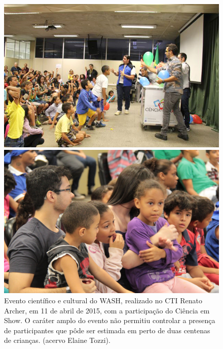 \captionsetup{format=plain}
\begin{figure}[htb]

\centering


\begin{minipage}[b]{0.4\linewidth}
        \centering
                \includegraphics[width=1.0\linewidth]{../../../imagens/Evento-Ciencia-Em-Show.jpg}
                \caption{Evento científico e cultural do WASH, realizado no CTI Renato Archer, em 11 de abril de 2015, com a participação do Ciência em Show. O caráter amplo do evento não permitiu controlar a presença de participantes que pôde ser estimada em perto de duas centenas de crianças. (acervo Elaine Tozzi).}
                \label{5340059e38852932c32c5ce8624858fef8a1f3f0}
\end{minipage}%
\hspace{0.5cm}
\begin{minipage}[b]{0.4\linewidth}
        \centering
                \includegraphics[width=1.0\linewidth]{../../../imagens/dia-das-criancas-2022-10-03-menor.JPG}

\end{minipage}
\end{figure}
